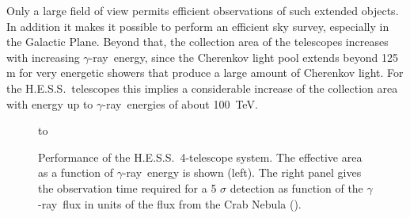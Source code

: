 \documentclass{svjour3x}                     %
\newcommand{\gr}{$\gamma$-ray}
\newcommand{\hess}{H.E.S.S.}
\begin{document}
Only a large field of view permits efficient observations of such extended
objects. In addition it makes it possible to perform an efficient sky survey, especially
in the Galactic Plane. Beyond that, the collection area of the telescopes
increases with increasing \gr\ energy, since the Cherenkov light pool extends
beyond 125 m for very energetic showers that produce a large amount of
Cherenkov light. For the \hess\ telescopes this implies a considerable increase
of the collection area with energy up to \gr\ energies of about 100~TeV.

\begin{figure}[b!]
\hbox to 
  \caption[Performance of \hess]{Performance of the \hess\ 4-telescope system. The effective area
    as a function of \gr\ energy is shown (left). The right panel gives the
    observation time required for a {5 $\sigma$} detection as function of the
    \gr\ flux in units of the flux from the Crab Nebula (\cite{benbow05,hesscrab}).}
  \label{fig:13}       %
\end{figure}
\end{document}
